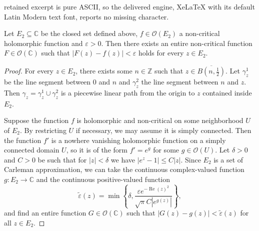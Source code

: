 \documentclass[10pt,a4paper]{amsart}
\DeclareMathOperator{\re}{Re}
\newcommand{\C}{\mathbb C}
\newcommand{\Z}{\mathbb Z}
\newcommand{\abs}[1]{\left|#1\right|}
\newcommand{\set}[1]{\left\{#1\right\}}
\begin{document}
retained excerpt is pure ASCII, so the delivered engine, XeLaTeX with its default Latin Modern text font, reports no missing character.
\begin{proposition}
    Let $E_2 \subseteq \C$ be the closed set defined above, $f \in \mathcal{O}(E_2)$ a non-critical holomorphic function and $\varepsilon > 0$.
    Then there exists an entire non-critical function $F \in \mathcal{O}(\C)$ such that $\abs{F(z)-f(z)} < \varepsilon$ holds for every $z \in E_2$.
\end{proposition}

\begin{proof}
For every $z \in E_2$, there exists some $n \in \Z$ such that $z \in \overline{B\left(n, \frac{1}{2}\right)}$.
Let $\gamma_z^1$ be the line segment between $0$ and $n$ and $\gamma_z^2$ the line segment between $n$ and $z$.
Then $\gamma_z = \gamma_z^1 \cup \gamma_z^2$ is a piecewise linear path from the origin to $z$ contained inside $E_2$.

Suppose the function $f$ is holomorphic and non-critical on some neighborhood $U$ of $E_2$.
By restricting $U$ if necessary, we may assume it is simply connected. 
Then the function $f'$ is a nowhere vanishing holomorphic function on a simply connected domain $U$, so it is of the form $f' = e^g$ for some $g \in \mathcal{O}(U)$.
Let $\delta > 0$ and $C > 0$ be such that for $\abs{z} < \delta$ we have $\abs{e^z-1} \le C \abs{z}$. 
Since $E_2$ is a set of Carleman approximation, we can take the continuous complex-valued function $g \colon E_2 \to \C$ and the continuous positive-valued function 
\[\tilde{\varepsilon}(z) = \min\set{\delta, \frac{\varepsilon e^{-\re(z)^2}}{\sqrt{\pi}C\abs{e^{g(z)}}}},\]
and find an entire function $G \in \mathcal{O}(\C)$ such that $\abs{G(z)-g(z)} < \tilde{\varepsilon}(z)$ for all $z \in E_2$.


\end{proof}
\end{document}
